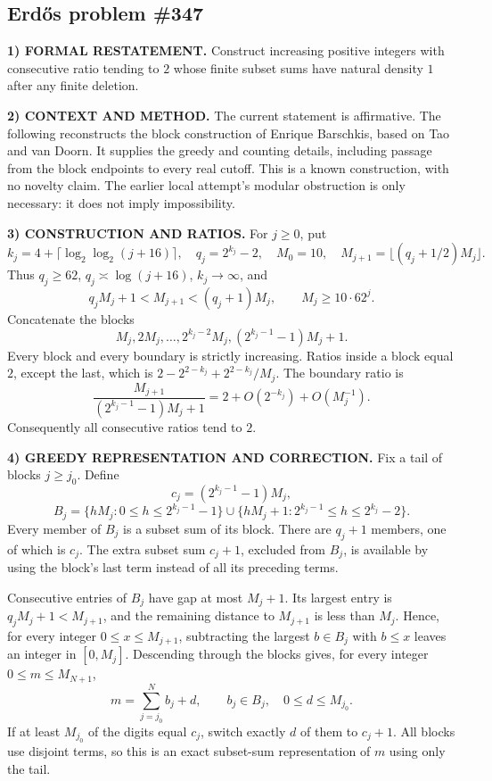 \subsection*{Erd\H{o}s problem \#347}

\noindent\textbf{1) FORMAL RESTATEMENT.}
Construct increasing positive integers with consecutive ratio tending to $2$ whose finite subset sums have natural density $1$ after any finite deletion.

\noindent\textbf{2) CONTEXT AND METHOD.}
The current statement is affirmative. The following reconstructs the block construction of Enrique Barschkis, based on Tao and van Doorn. It supplies the greedy and counting details, including passage from the block endpoints to every real cutoff. This is a known construction, with no novelty claim. The earlier local attempt's modular obstruction is only necessary: it does not imply impossibility.

\noindent\textbf{3) CONSTRUCTION AND RATIOS.}
For $j\ge0$, put
\[
 k_j=4+\lceil\log_2\log_2(j+16)\rceil,\quad q_j=2^{k_j}-2,
 \quad M_0=10,\quad M_{j+1}=\lfloor(q_j+1/2)M_j\rfloor.
\]
Thus $q_j\ge62$, $q_j\asymp\log(j+16)$, $k_j\to\infty$, and
\[
 q_jM_j+1<M_{j+1}<(q_j+1)M_j,
 \qquad M_j\ge10\cdot62^j.
\]
Concatenate the blocks
\[
 M_j,2M_j,\ldots,2^{k_j-2}M_j,
 (2^{k_j-1}-1)M_j+1.
\]
Every block and every boundary is strictly increasing. Ratios inside a block equal $2$, except the last, which is
$2-2^{2-k_j}+2^{2-k_j}/M_j$. The boundary ratio is
\[
 \frac{M_{j+1}}{(2^{k_j-1}-1)M_j+1}
 =2+O(2^{-k_j})+O(M_j^{-1}).
\]
Consequently all consecutive ratios tend to $2$.

\noindent\textbf{4) GREEDY REPRESENTATION AND CORRECTION.}
Fix a tail of blocks $j\ge j_0$. Define
\[
 c_j=(2^{k_j-1}-1)M_j,
\]
\[
 B_j=\{hM_j:0\le h\le2^{k_j-1}-1\}
 \cup\{hM_j+1:2^{k_j-1}\le h\le2^{k_j}-2\}.
\]
Every member of $B_j$ is a subset sum of its block. There are $q_j+1$ members, one of which is $c_j$. The extra subset sum $c_j+1$, excluded from $B_j$, is available by using the block's last term instead of all its preceding terms.

Consecutive entries of $B_j$ have gap at most $M_j+1$. Its largest entry is $q_jM_j+1<M_{j+1}$, and the remaining distance to $M_{j+1}$ is less than $M_j$. Hence, for every integer $0\le x\le M_{j+1}$, subtracting the largest $b\in B_j$ with $b\le x$ leaves an integer in $[0,M_j]$. Descending through the blocks gives, for every integer $0\le m\le M_{N+1}$,
\[
 m=\sum_{j=j_0}^{N}b_j+d,\qquad b_j\in B_j,\quad0\le d\le M_{j_0}.
\]
If at least $M_{j_0}$ of the digits equal $c_j$, switch exactly $d$ of them to $c_j+1$. All blocks use disjoint terms, so this is an exact subset-sum representation of $m$ using only the tail.

